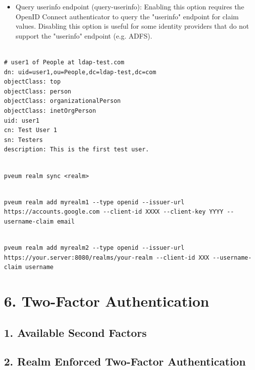 \begin{itemize}[leftmargin=2cm]

	\item Query userinfo endpoint (query-userinfo): Enabling this option requires the OpenID Connect authenticator to query the "userinfo" endpoint for claim values. Disabling this option is useful for some identity providers that do not support the "userinfo" endpoint (e.g. ADFS).

\end{itemize}

\begin{lstlisting}

# user1 of People at ldap-test.com
dn: uid=user1,ou=People,dc=ldap-test,dc=com
objectClass: top
objectClass: person
objectClass: organizationalPerson
objectClass: inetOrgPerson
uid: user1
cn: Test User 1
sn: Testers
description: This is the first test user.

\end{lstlisting}

\begin{lstlisting}

pveum realm sync <realm>

\end{lstlisting}

\begin{lstlisting}

pveum realm add myrealm1 --type openid --issuer-url  https://accounts.google.com --client-id XXXX --client-key YYYY --username-claim email

\end{lstlisting}

\begin{lstlisting}

pveum realm add myrealm2 --type openid --issuer-url  https://your.server:8080/realms/your-realm --client-id XXX --username-claim username

\end{lstlisting}


\section{6. Two-Factor Authentication}

\subsection{1. Available Second Factors}

\subsection{2. Realm Enforced Two-Factor Authentication}

